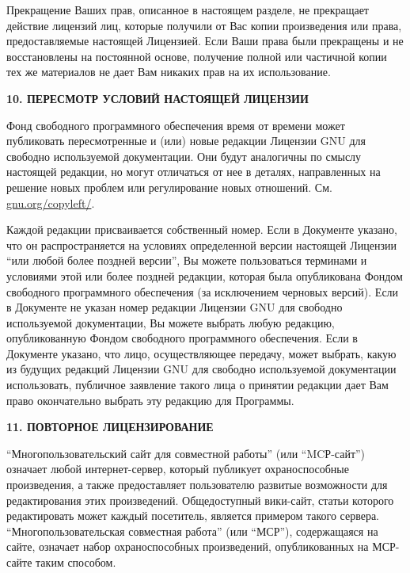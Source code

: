 Прекращение Ваших прав, описанное в настоящем разделе, не прекращает
действие лицензий лиц, которые получили от Вас копии произведения или
права, предоставляемые настоящей Лицензией. Если Ваши права были
прекращены и не восстановлены на постоянной основе, получение полной
или частичной копии тех же материалов не дает Вам никаких прав на их
использование.

\begin{center}
{\Large\bf 10. ПЕРЕСМОТР УСЛОВИЙ НАСТОЯЩЕЙ ЛИЦЕНЗИИ\par}
\end{center}

Фонд свободного программного обеспечения время от времени может
публиковать пересмотренные и (или) новые редакции Лицензии GNU для
свободно используемой документации. Они будут аналогичны по смыслу
настоящей редакции, но могут отличаться от нее в деталях, направленных
на решение новых проблем или регулирование новых отношений. См.
\href{https://www.gnu.org/copyleft/}{gnu.org/copyleft/}.

Каждой редакции присваивается собственный номер. Если в Документе
указано, что он распространяется на условиях определенной версии
настоящей Лицензии \enquote{или любой более поздней версии}, Вы можете
пользоваться терминами и условиями этой или более поздней редакции,
которая была опубликована Фондом свободного программного обеспечения
(за исключением черновых версий). Если в Документе не указан номер
редакции Лицензии GNU для свободно используемой документации, Вы
можете выбрать любую редакцию, опубликованную Фондом свободного
программного обеспечения. Если в Документе указано, что лицо,
осуществляющее передачу, может выбрать, какую из будущих редакций
Лицензии GNU для свободно используемой документации использовать,
публичное заявление такого лица о принятии редакции дает Вам право
окончательно выбрать эту редакцию для Программы.

\begin{center}
{\Large\bf 11. ПОВТОРНОЕ ЛИЦЕНЗИРОВАНИЕ\par}
\end{center}

\enquote{Многопользовательский сайт для совместной работы} (или
\enquote{MCР-сайт}) означает любой интернет-сервер, который публикует
охраноспособные произведения, а также предоставляет пользователю
развитые возможности для редактирования этих
произведений. Общедоступный вики-сайт, статьи которого редактировать
может каждый посетитель, является примером такого
сервера. \enquote{Многопользовательская совместная работа} (или
\enquote{МСР}), содержащаяся на сайте, означает набор охраноспособных
произведений, опубликованных на МСР-сайте таким способом.

